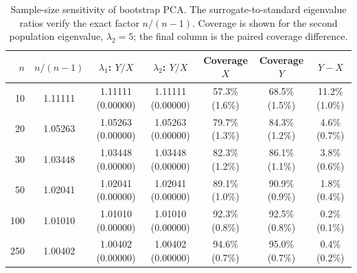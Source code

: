 \begin{table}[htbp]\centering\scriptsize\caption{Sample-size sensitivity of bootstrap PCA. The surrogate-to-standard eigenvalue ratios verify the exact factor $n/(n-1)$. Coverage is shown for the second population eigenvalue, $\lambda_2=5$; the final column is the paired coverage difference.}\label{tab:sample_size_pca}\begin{tabular}{rcccccc}\hline\hline$n$ & $n/(n-1)$ & $\lambda_1$: $Y/X$ & $\lambda_2$: $Y/X$ & Coverage $X$ & Coverage $Y$ & $Y-X$ \\\hline10 & 1.11111 & 1.11111 (0.00000) & 1.11111 (0.00000) & 57.3\% (1.6\%) & 68.5\% (1.5\%) & 11.2\% (1.0\%) \\
20 & 1.05263 & 1.05263 (0.00000) & 1.05263 (0.00000) & 79.7\% (1.3\%) & 84.3\% (1.2\%) & 4.6\% (0.7\%) \\
30 & 1.03448 & 1.03448 (0.00000) & 1.03448 (0.00000) & 82.3\% (1.2\%) & 86.1\% (1.1\%) & 3.8\% (0.6\%) \\
50 & 1.02041 & 1.02041 (0.00000) & 1.02041 (0.00000) & 89.1\% (1.0\%) & 90.9\% (0.9\%) & 1.8\% (0.4\%) \\
100 & 1.01010 & 1.01010 (0.00000) & 1.01010 (0.00000) & 92.3\% (0.8\%) & 92.5\% (0.8\%) & 0.2\% (0.1\%) \\
250 & 1.00402 & 1.00402 (0.00000) & 1.00402 (0.00000) & 94.6\% (0.7\%) & 95.0\% (0.7\%) & 0.4\% (0.2\%) \\\hline\hline\end{tabular}\end{table}
